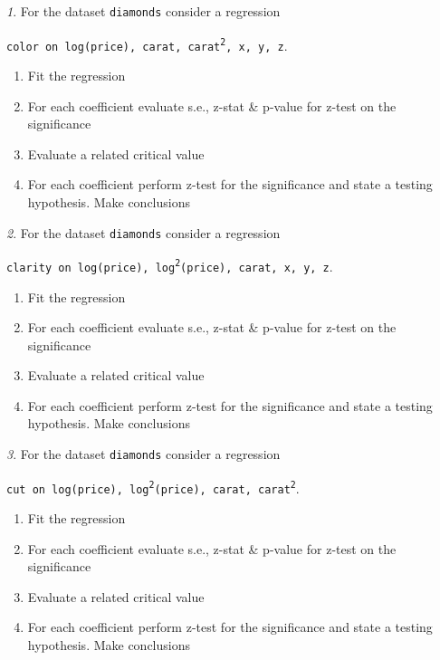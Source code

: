 \documentclass[12pt]{article}
\theoremstyle{remark}
\newtheorem{problem}{}[section]
\begin{document}
\begin{problem}
For the dataset \texttt{diamonds} consider a regression
\begin{center}
	\texttt{color on log(price), carat, carat\textsuperscript{2}, x, y, z}.
\end{center}
\begin{enumerate}
	\item Fit the regression
	\item For each coefficient evaluate s.e., z-stat \& p-value for z-test on the significance 
	\item Evaluate a related critical value
	\item For each coefficient perform z-test for the significance and state a testing hypothesis. 
	Make conclusions
\end{enumerate}
\end{problem}

\begin{problem}
For the dataset \texttt{diamonds} consider a regression
\begin{center}
	\texttt{clarity on log(price), log\textsuperscript{2}(price), carat, x, y, z}.
\end{center}
\begin{enumerate}
	\item Fit the regression
	\item For each coefficient evaluate s.e., z-stat \& p-value for z-test on the significance 
	\item Evaluate a related critical value
	\item For each coefficient perform z-test for the significance and state a testing hypothesis. 
	Make conclusions
\end{enumerate}
\end{problem}

\begin{problem}
For the dataset \texttt{diamonds} consider a regression
\begin{center}
	\texttt{cut on log(price), log\textsuperscript{2}(price), carat, carat\textsuperscript{2}}.
\end{center}
\begin{enumerate}
	\item Fit the regression
	\item For each coefficient evaluate s.e., z-stat \& p-value for z-test on the significance 
	\item Evaluate a related critical value
	\item For each coefficient perform z-test for the significance and state a testing hypothesis. 
	Make conclusions
\end{enumerate}
\end{problem}
\end{document}
